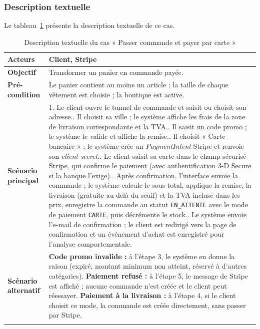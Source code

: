 \subsubsection{Description textuelle}
Le tableau~\ref{tab:uc-commande} présente la description textuelle de ce cas.
\renewcommand{\arraystretch}{1.5}
\begin{longtable}{|p{4cm}|p{11cm}|}
\hline
\textbf{Acteurs} & Client, Stripe \\
\hline
\textbf{Objectif} & Transformer un panier en commande payée. \\
\hline
\textbf{Pré-condition} & Le panier contient au moins un article ; la taille de chaque vêtement est choisie ; la boutique est active. \\
\hline
\textbf{Scénario principal} &
1. Le client ouvre le tunnel de commande et saisit ou choisit son adresse.\newline
2. Il choisit sa ville ; le système affiche les frais de la zone de livraison correspondante et la TVA.\newline
3. Il saisit un code promo ; le système le valide et affiche la remise.\newline
4. Il choisit « Carte bancaire » ; le système crée un \textit{PaymentIntent} Stripe et renvoie son \textit{client secret}.\newline
5. Le client saisit sa carte dans le champ sécurisé Stripe, qui confirme le paiement (avec authentification 3-D Secure si la banque l'exige).\newline
6. Après confirmation, l'interface envoie la commande ; le système calcule le sous-total, applique la remise, la livraison (gratuite au-delà du seuil) et la TVA incluse dans les prix, enregistre la commande au statut \texttt{EN\_ATTENTE} avec le mode de paiement \texttt{CARTE}, puis décrémente le stock.\newline
7. Le système envoie l'e-mail de confirmation ; le client est redirigé vers la page de confirmation et un événement d'achat est enregistré pour l'analyse comportementale. \\
\hline
\textbf{Scénario alternatif} &
\textbf{Code promo invalide :} à l'étape 3, le système en donne la raison (expiré, montant minimum non atteint, réservé à d'autres catégories).\newline
\textbf{Paiement refusé :} à l'étape 5, le message de Stripe est affiché ; aucune commande n'est créée et le client peut réessayer.\newline
\textbf{Paiement à la livraison :} à l'étape 4, si le client choisit ce mode, la commande est créée directement, sans passer par Stripe. \\
\hline
\caption{Description textuelle du cas « Passer commande et payer par carte »}
\label{tab:uc-commande}
\end{longtable}

